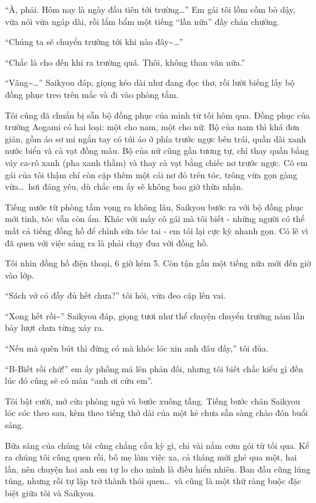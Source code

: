 \documentclass[../main.tex]{subfiles}
\begin{document}
``À, phải. Hôm nay là ngày đầu tiên tới trường\dots'' Em gái tôi lồm cồm bò dậy, vừa nói vừa ngáp dài, rồi lẩm bẩm một tiếng ``lần nữa'' đầy chán chường.

``Chúng ta sẽ chuyển trường tới khi nào đây\~{}\dots''

``Chắc là cho đến khi ra trường quá. Thôi, không than vãn nữa.''

``Vâng\~{}\dots'' Saikyou đáp, giọng kéo dài như đang đọc thơ, rồi lười biếng lấy bộ đồng phục treo trên mắc và đi vào phòng tắm.

Tôi cũng đã chuẩn bị sẵn bộ đồng phục của mình từ tối hôm qua. Đồng phục của trường Aogami có hai loại: một cho nam, một cho nữ. Bộ của nam thì khá đơn giản, gồm áo sơ mi ngắn tay có túi áo ở phía trước ngực bên trái, quần dài xanh nước biển và cà vạt đồng màu. Bộ của nữ cũng gần tương tự, chỉ thay quần bằng váy ca-rô xanh (pha xanh thẫm) và thay cà vạt bằng chiếc nơ trước ngực. Cô em gái của tôi thậm chí còn cặp thêm một cái nơ đỏ trên tóc, trông vừa gọn gàng vừa\dots\ hơi đáng yêu, dù chắc em ấy sẽ không bao giờ thừa nhận.

Tiếng nước từ phòng tắm vọng ra không lâu, Saikyou bước ra với bộ đồng phục mới tinh, tóc vẫn còn ẩm. Khác với mấy cô gái mà tôi biết - những người có thể mất cả tiếng đồng hồ để chỉnh sửa tóc tai - em tôi lại cực kỳ nhanh gọn. Có lẽ vì đã quen với việc sáng ra là phải chạy đua với đồng hồ.

Tôi nhìn đồng hồ điện thoại, 6 giờ kém 5. Còn tận gần một tiếng nữa mới đến giờ vào lớp.

``Sách vở có đầy đủ hết chưa?'' tôi hỏi, vừa đeo cặp lên vai.

``Xong hết rồi\~{}'' Saikyou đáp, giọng tươi như thể chuyện chuyển trường năm lần bảy lượt chưa từng xảy ra.

``Nếu mà quên bút thì đừng có mà khóc lóc xin anh đâu đấy,'' tôi đùa.

``B-Biết rồi chứ!'' em ấy phồng má lên phản đối, nhưng tôi biết chắc kiểu gì đến lúc đó cũng sẽ có màn ``anh ơi cứu em''.

Tôi bật cười, mở cửa phòng ngủ và bước xuống tầng. Tiếng bước chân Saikyou lóc cóc theo sau, kèm theo tiếng thở dài của một kẻ chưa sẵn sàng chào đón buổi sáng.

\ct

Bữa sáng của chúng tôi cũng chẳng cầu kỳ gì, chỉ vài nắm cơm gói từ tối qua. Kể ra chúng tôi cũng quen rồi, bố mẹ làm việc xa, cả tháng mới ghé qua một, hai lần, nên chuyện hai anh em tự lo cho mình là điều hiển nhiên. Ban đầu cũng lúng túng, nhưng rồi tự lập trở thành thói quen\dots\ và cũng là một thứ ràng buộc đặc biệt giữa tôi và Saikyou.
\end{document}
